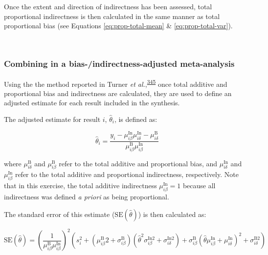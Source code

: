 \documentclass[a4paper, twoside]{templates/ociamthesis}
\begin{document}
Once the extent and direction of indirectness has been assessed, total proportional indirectness is then calculated in the same manner as total proportional bias (see Equations \eqref{eq:prop-total-mean} \& \eqref{eq:prop-total-var}).

~

\hypertarget{combining-in-a-bias-indirectness-adjusted-meta-analysis}{%
\subsubsection{Combining in a bias-/indirectness-adjusted meta-analysis}\label{combining-in-a-bias-indirectness-adjusted-meta-analysis}}

Using the the method reported in Turner \emph{et al.},\textsuperscript{\protect\hyperlink{ref-turner2009}{345}} once total additive and proportional bias and indirectness are calculated, they are used to define an adjusted estimate for each result included in the synthesis.

The adjusted estimate for result \(i\), \(\hat{\theta}_i\), is defined as:

\begin{equation}
  \hat{\theta}_i = \frac{y_i - \mu_{i\beta}^{\mathrm{In}}\mu_{i\delta}^{\mathrm{In}} - \mu_{i\delta}^{\mathrm{B}}}{\mu_{i\beta}^{\mathrm{B}}\mu_{i\beta}^{\mathrm{In}}}
  \label{eq:adjusted-mean}
\end{equation}

where \(\mu_{i\delta}^{\mathrm{B}}\) and \(\mu_{i\beta}^{\mathrm{B}}\) refer to the total additive and proportional bias, and \(\mu_{i\delta}^{\mathrm{In}}\) and \(\mu_{i\beta}^{\mathrm{In}}\) refer to the total additive and proportional indirectness, respectively. Note that in this exercise, the total additive indirectness \(\mu_{i\beta}^{\mathrm{In}} = 1\) because all indirectness was defined \emph{a priori} as being proportional.

The standard error of this estimate (\(\mathrm{SE}(\hat{\theta})\)) is then calculated as:

\begin{equation}
  \mathrm{SE}(\hat{\theta})=\left(\frac{1}{\mu_{i \beta}^{\mathrm{B}} \mu_{i \beta}^{\mathrm{In}}}\right)^{2}\left(s_{i}^{2}+\left(\mu_{i \beta}^{\mathrm{B}} 2+\sigma_{i \beta}^{\mathrm{B}}\right)\left(\hat{\theta}^{2} \sigma_{i \beta}^{\mathrm{In} 2}+\sigma_{i \delta}^{\mathrm{In} 2}\right)+\sigma_{i \beta}^{\mathrm{B}}\left(\hat{\theta} \mu_{i \beta}^{\mathrm{In}}+\mu_{i \delta}^{\mathrm{In}}\right)^{2}+\sigma_{i \delta}^{\mathrm{B} 2}\right)
  \label{eq:adjusted-se}
\end{equation}
\end{document}
